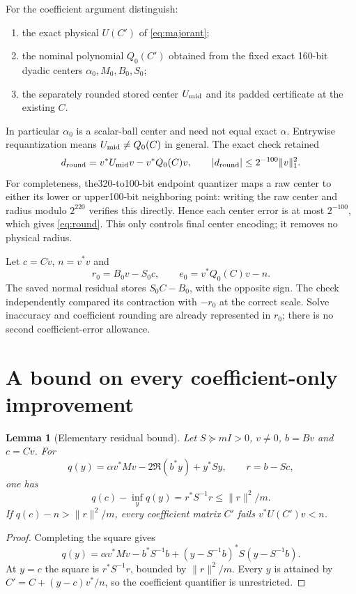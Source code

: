 \documentclass[11pt,a4paper]{article}
\newcommand{\norm}[1]{\lVert #1\rVert}
\newtheorem{lemma}[theorem]{Lemma}
\theoremstyle{definition}
\theoremstyle{remark}
\numberwithin{equation}{section}
\begin{document}
For the coefficient argument distinguish:
\begin{enumerate}
\item the exact physical $U(C')$ of \eqref{eq:majorant};
\item the nominal polynomial $Q_0(C')$ obtained from the fixed exact
160-bit dyadic centers $\alpha_0,M_0,B_0,S_0$;
\item the separately rounded stored center $U_{\rm mid}$ and its padded
certificate at the existing $C$.
\end{enumerate}
In particular $\alpha_0$ is a scalar-ball center and need not equal exact
$\alpha$. Entrywise requantization means $U_{\rm mid}\ne Q_0(C)$ in
general. The exact check retained
\begin{equation}\label{eq:round}
 d_{\rm round}=v^*U_{\rm mid}v-v^*Q_0(C)v,
 \qquad |d_{\rm round}|\le2^{-100}\norm v_1^2.
\end{equation}
For completeness, the320-to100-bit endpoint quantizer maps a raw center
to either its lower or upper100-bit neighboring point: writing the raw
center and radius modulo $2^{220}$ verifies this directly. Hence each
center error is at most $2^{-100}$, which gives \eqref{eq:round}.
This only controls final center encoding; it removes no physical radius.

Let $c=Cv$, $n=v^*v$ and
\begin{equation}
 r_0=B_0v-S_0c,\qquad e_0=v^*Q_0(C)v-n.
\end{equation}
The saved normal residual stores $S_0C-B_0$, with the opposite sign.
The check independently compared its contraction with $-r_0$ at the
correct scale. Solve inaccuracy and coefficient rounding are already
represented in $r_0$; there is no second coefficient-error allowance.

\section{A bound on every coefficient-only improvement}

\begin{lemma}[Elementary residual bound]\label{lem:residual}
Let $S\succeq mI>0$, $v\ne0$, $b=Bv$ and $c=Cv$. For
\[
 q(y)=\alpha v^*Mv-2\Re(b^*y)+y^*Sy,\qquad r=b-Sc,
\]
one has
\begin{equation}\label{eq:gap}
 q(c)-\inf_yq(y)=r^*S^{-1}r\le\norm r^2/m.
\end{equation}
If $q(c)-n>\norm r^2/m$, every coefficient matrix $C'$ fails
$v^*U(C')v<n$.
\end{lemma}
\begin{proof}
Completing the square gives
\[
 q(y)=\alpha v^*Mv-b^*S^{-1}b
          +(y-S^{-1}b)^*S(y-S^{-1}b).
\]
At $y=c$ the square is $r^*S^{-1}r$, bounded by
$\norm r^2/m$. Every $y$ is attained by
$C'=C+(y-c)v^*/n$, so the coefficient quantifier is unrestricted.
\end{proof}
\end{document}
